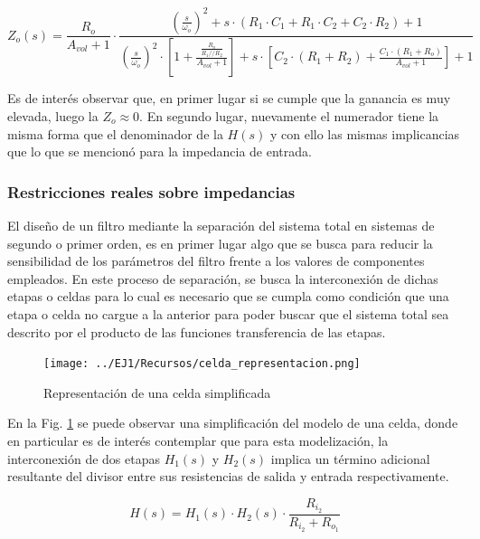 \begin{equation}
    Z_o(s) = \frac{R_o}{A_{vol} + 1} \cdot
    \frac{\left( \frac{s}{\omega_o} \right)^{2} + s \cdot (R_1 \cdot C_1 + R_1 \cdot C_2 + C_2 \cdot R_2) + 1}
    {\left( \frac{s}{\omega_o} \right)^{2} \cdot \left[ 1 + \frac{\frac{R_o}{R_1 // R_2}}{A_{vol} + 1} \right] + s \cdot \left[ C_2 \cdot (R_1 + R_2) + \frac{C_1 \cdot (R_1 + R_o)}{A_{vol} + 1} \right] + 1}
    \label{eq:impedancia_salida_simplificada}
\end{equation}

Es de inter\'es observar que, en primer lugar si se cumple que la ganancia es muy elevada, luego la $Z_o \approx 0$. En segundo lugar,
nuevamente el numerador tiene la misma forma que el denominador de la $H(s)$ y con ello las mismas implicancias que lo que se mencion\'o para la impedancia de entrada.

\subsubsection{Restricciones reales sobre impedancias}
El dise\~no de un filtro mediante la separaci\'on del sistema total en sistemas de segundo o primer orden, es en primer lugar algo que se busca para reducir la sensibilidad
de los par\'ametros del filtro frente a los valores de componentes empleados. En este proceso de separaci\'on, se busca la interconexi\'on de dichas etapas o celdas para lo cual
es necesario que se cumpla como condici\'on que una etapa o celda no cargue a la anterior para poder buscar que el sistema total sea descrito por el producto de las funciones transferencia
de las etapas.

\begin{figure}[H]
    \centering
    \texttt{[image: ../EJ1/Recursos/celda\_representacion.png]}
    \caption{Representaci\'on de una celda simplificada}
    \label{fig:celda_representacion}
\end{figure}

En la Fig. \ref{fig:celda_representacion} se puede observar una simplificaci\'on del modelo de una celda,
donde en particular es de inter\'es contemplar que para esta modelizaci\'on, la interconexi\'on de dos etapas $H_1(s)$ y $H_2(s)$
implica un t\'ermino adicional resultante del divisor entre sus resistencias de salida y entrada respectivamente.

\begin{equation}
    H(s) = H_1(s) \cdot H_2(s) \cdot \frac{R_{i_2}}{R_{i_2} + R_{o_1}}
\end{equation}

